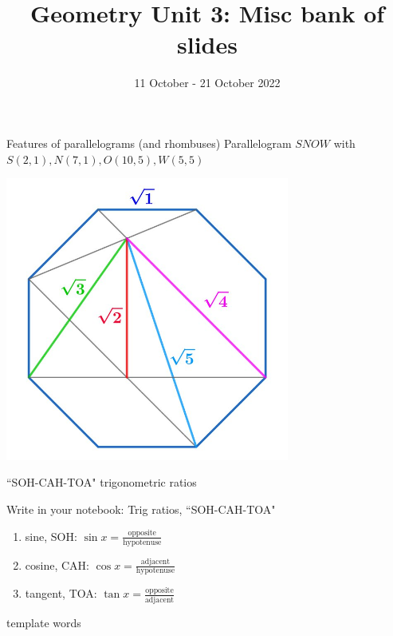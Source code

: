 \documentclass[onlytextwidth]{beamer}
\title{Geometry Unit 3: Misc bank of slides}
\date{11 October - 21 October 2022}
\begin{document}
\frame{\titlepage}
\section[Outline]{}
\frame{\tableofcontents}

\begin{frame}{Features of parallelograms (and rhombuses)}
  Parallelogram $SNOW$ with $S(2,1),N(7,1),O(10,5),W(5,5)$\\[0.5cm]
\end{frame}

\begin{frame}
  \includegraphics[width=0.7\textwidth]{../graphics/octagon-radicals.jpg}
\end{frame}

\begin{frame}{``SOH-CAH-TOA" trigonometric ratios}
  \begin{block}{Write in your notebook: Trig ratios, ``SOH-CAH-TOA"}
    \begin{enumerate}
        \item sine, SOH: $\displaystyle \sin x = \frac{\text{opposite}} {\text{hypotenuse}}$
        \item cosine, CAH: $\displaystyle \cos x = \frac{\text{adjacent}} {\text{hypotenuse}}$
        \item tangent, TOA: $\displaystyle \tan x = \frac{\text{opposite}} {\text{adjacent}}$
    \end{enumerate}
    \end{block}
\end{frame}


\begin{frame}{template}
  words
\end{frame}
\end{document}
